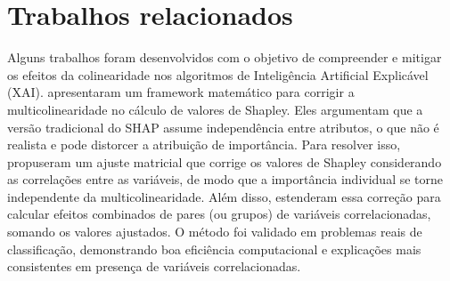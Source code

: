 




\section{Trabalhos relacionados}\label{sec:trabalhos_relacionados}

Alguns trabalhos foram desenvolvidos com o objetivo de compreender e mitigar os efeitos da colinearidade nos algoritmos de Inteligência Artificial Explicável (XAI).  apresentaram um framework matemático para corrigir a multicolinearidade no cálculo de valores de Shapley. Eles argumentam que a versão tradicional do SHAP assume independência entre atributos, o que não é realista e pode distorcer a atribuição de importância. Para resolver isso, propuseram um ajuste matricial que corrige os valores de Shapley considerando as correlações entre as variáveis, de modo que a importância individual se torne independente da multicolinearidade. Além disso, estenderam essa correção para calcular efeitos combinados de pares (ou grupos) de variáveis correlacionadas, somando os valores ajustados. O método foi validado em problemas reais de classificação, demonstrando boa eficiência computacional e explicações mais consistentes em presença de variáveis correlacionadas.

